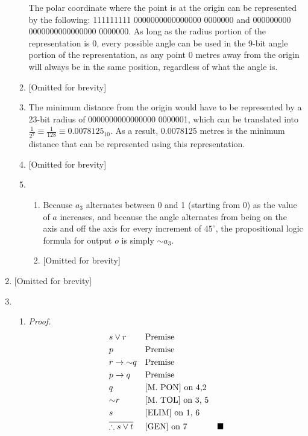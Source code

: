 \documentclass[11pt, notitlepage, leqno]{article}
\renewcommand{\neg}{\mathord{\sim}}
\begin{document}
\begin{enumerate}
\begin{enumerate}
The polar coordinate where the point is at the origin can be represented by the following:
111111111 0000000000000000 0000000 and 000000000 0000000000000000 0000000. As long as the radius portion of the representation is 0, every possible angle can be used in the 9-bit angle portion of the representation, as any point 0 metres away from the origin will always be in the same position, regardless of what the angle is.

\item {[Omitted for brevity]}

\item The minimum distance from the origin would have to be represented by a 23-bit radius of 0000000000000000 0000001, which can be translated into $\frac{1}{2^7} \equiv \frac{1}{128} \equiv 0.0078125_{10}$. As a result, 0.0078125 metres is the minimum distance that can be represented using this representation.

\item {[Omitted for brevity]}

\item \begin{enumerate}

\item Because $a_3$ alternates between 0 and 1 (starting from 0) as the value of $a$ increases, and because the angle alternates from being on the axis and off the axis for every increment of $45^\circ$, the propositional logic formula for output $o$ is simply $\neg a_3$.

\item {[Omitted for brevity]}

\end{enumerate}

\end{enumerate}

\item {[Omitted for brevity]}

\item \begin{enumerate}

\item \textit{Proof.} \nopagebreak \vspace{-10pt} 
\begin{align}
	& s \vee r 		&& \textrm{Premise}\\
 	& p 				&& \textrm{Premise}\\
 	& r \to \neg q 		&& \textrm{Premise}\\
 	& p \to q 			&& \textrm{Premise}\\
 	& q 				&& \textrm{[M.\ PON] on 4,2}\\
 	& \neg r 			&& \textrm{[M.\ TOL] on 3, 5}\\
 	& s 				&& \textrm{[ELIM] on 1, 6}\\
 	& \notag\overline{\therefore s \vee t} && \textrm{[GEN] on 7} & \blacksquare
\end{align}


\end{enumerate}
\end{enumerate}
\end{document}
